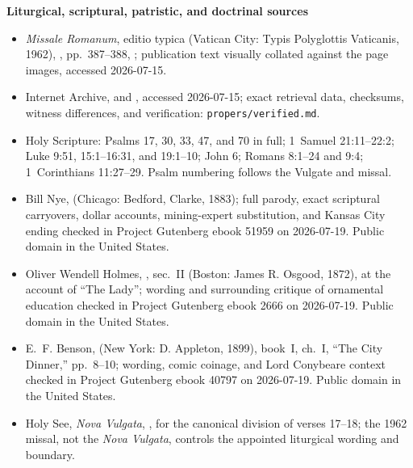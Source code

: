 \begin{deepstudy}
\textbf{Liturgical, scriptural, patristic, and doctrinal sources}
{\fontsize{8.0}{8.8}\selectfont
\begin{itemize}[itemsep=0em,topsep=0.15em,parsep=0pt]
\item \emph{Missale Romanum}, editio typica (Vatican City: Typis Polyglottis Vaticanis, 1962), , pp.~387--388, ; publication text visually collated against the page images, accessed 2026-07-15.
\item Internet Archive,  and , accessed 2026-07-15; exact retrieval data, checksums, witness differences, and verification: \texttt{propers/verified.md}.
\item Holy Scripture: Psalms 17, 30, 33, 47, and 70 in full; 1~Samuel 21:11--22:2; Luke 9:51, 15:1--16:31, and 19:1--10; John 6; Romans 8:1--24 and 9:4; 1~Corinthians 11:27--29. Psalm numbering follows the Vulgate and missal.
\item Bill Nye,  (Chicago: Bedford, Clarke, 1883); full parody, exact scriptural carryovers, dollar accounts, mining-expert substitution, and Kansas City ending checked in Project Gutenberg ebook 51959 on 2026-07-19. Public domain in the United States.
\item Oliver Wendell Holmes, , sec.~II (Boston: James R. Osgood, 1872), at the account of ``The Lady''; wording and surrounding critique of ornamental education checked in Project Gutenberg ebook 2666 on 2026-07-19. Public domain in the United States.
\item E.~F. Benson,  (New York: D. Appleton, 1899), book~I, ch.~I, ``The City Dinner,'' pp.~8--10; wording, comic coinage, and Lord Conybeare context checked in Project Gutenberg ebook 40797 on 2026-07-19. Public domain in the United States.
\item Holy See, \emph{Nova Vulgata}, , for the canonical division of verses 17--18; the 1962 missal, not the \emph{Nova Vulgata}, controls the appointed liturgical wording and boundary.

\end{itemize}}
\end{deepstudy}
